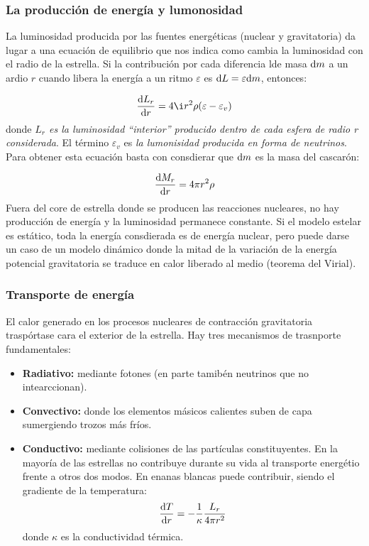 \subsubsection{La producción de energía y lumonosidad}

La luminosidad producida por las fuentes energéticas (nuclear y gravitatoria) da lugar a una ecuación de equilibrio que nos indica como cambia la luminosidad con el radio de la estrella. Si la contribución por cada diferencia lde masa $\mathrm{d} m$ a un ardio $r$ cuando libera la energía a un ritmo $\varepsilon$ es $\mathrm{d} L = \varepsilon \mathrm{d} m$, entonces:

\begin{equation}
    \derivadas{L_r}{r} = 4 \i r^2 \rho (\varepsilon-\varepsilon_{{v}})
\end{equation}
donde \textit{$L_r$ es la luminosidad ``interior'' producido dentro de cada esfera de radio r considerada}. El término $\varepsilon_v$ es \textit{la lumonisidad producida en forma de neutrinos}. Para obtener esta ecuación basta con consdierar que $\mathrm{d} m$ es la masa del cascarón:

\begin{equation*}
    \frac{\mathrm{d} M_r}{\mathrm{d} r} = 4 \pi r^2 \rho
\end{equation*}
Fuera del core de estrella donde se producen las reacciones nucleares, no hay producción de energía y la luminosidad permanece constante. Si el modelo estelar es estático, toda la energía consdierada es de energía nuclear, pero puede darse un caso de un modelo dinámico donde la mitad de la variación de la energía potencial gravitatoria se traduce en calor liberado al medio (teorema del Virial).

\subsubsection{Transporte de energía}

El calor generado en los procesos nucleares de contracción gravitatoria traspórtase cara el exterior de la estrella. Hay tres mecanismos de trasnporte fundamentales:

\begin{itemize}
    \item \textbf{Radiativo:} mediante fotones (en parte tamibén neutrinos que no intearccionan). 
    \item \textbf{Convectivo:} donde los elementos másicos calientes suben de capa sumergiendo trozos más fríos.
    \item \textbf{Conductivo:} mediante colisiones de las partículas constituyentes. En la mayoría de las estrellas no contribuye durante su vida al transporte energétio frente a otros dos modos. En enanas blancas puede contribuir, siendo el gradiente de la temperatura:
    \begin{equation}
        \frac{\mathrm{d} T}{\mathrm{d} r} = - \frac{1}{\kappa} \frac{L_r}{4\pi r^2}
    \end{equation}
    donde $\kappa$ es la conductividad térmica. 
\end{itemize}

